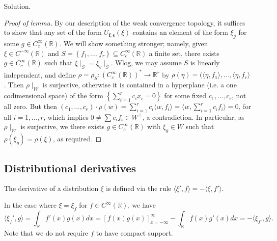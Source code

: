 \documentclass[12pt, draft,reqno,a4paper, twoside]{amsproc}
\newcommand{\dbR}{\mathbb R}
\newcommand{\gen}[1]{\langle{#1}\rangle}
\newcommand{\set}[1]{\left\{{#1}\right\}}
\newenvironment{sol}{\sc Solution. \rm}{\hfill \qedsymbol\bigskip}
\begin{document}
\begin{sol}
\begin{proof}[Proof of lemma]
	By our description of the weak convergence topology, it suffices to show that any set of the form $U_{\boldsymbol{f},\boldsymbol{\epsilon}}(\xi)$ contains an element of the form $\xi_g$ for some $g\in C_c^\infty(\dbR)$. We will show something stronger; namely, given $\xi\in C^{-\infty}(\dbR)$ and $S=\set{f_1,\ldots,f_r}\subseteq C_c^\infty(\dbR)$ a finite set, there exists $g\in C_c^\infty(\dbR)$ such that $\xi\mid_S=\xi_g\mid_S$. Wlog, we may assume $S$ is linearly independent, and define $\rho=\rho_S:(C_c^\infty(\dbR))^*\to\dbR^r$ by $\rho(\eta)=(\gen{\eta,f_1},\ldots,\gen{\eta,f_r}$. Then $\rho\mid_W$ is surjective, otherwise it is contained in a hyperplane (i.e. a one codimensional space) of the form $\set{\sum_{i=1}^r c_i x_i=0}$ for some fixed $c_1,\ldots,c_r$, not all zero. But then $(c_1,\ldots,c_r)\cdot \rho(w)=\sum_{i=1}^r c_i\gen{w,f_i}=\gen{w,\sum_{i=1}^r c_if_i}=0$, for all $i=1,\ldots,r$, which implies $0\ne \sum c_if_i\in W^\perp$, a contradiction. In particular, as $\rho\mid_W$ is surjective, we there exists $g\in C_c^\infty(\dbR)$ with $\xi_g\in W$ such that $\rho(\xi_g)=\rho(\xi)$, as required.\renewcommand{\qedsymbol}{}
\end{proof}
%
\end{sol}

\subsection{Distributional derivatives}

\begin{defi} The derivative of a distribution $\xi$ is defined via the rule $\gen{\xi',f}=-\gen{\xi,f'}$.
\end{defi}
In the case where $\xi=\xi_f$ for $f\in C^\infty(\dbR)$, we have
\[\gen{\xi_f',g}=\int_{\dbR}f'(x)g(x)dx=\left[f(x)g(x)\right]_{x=-\infty}^\infty-\int_{\dbR}f(x)g'(x)dx=-\gen{\xi_{f'},g}.\]
Note that we do not require $f$ to have compact support.
\end{document}
